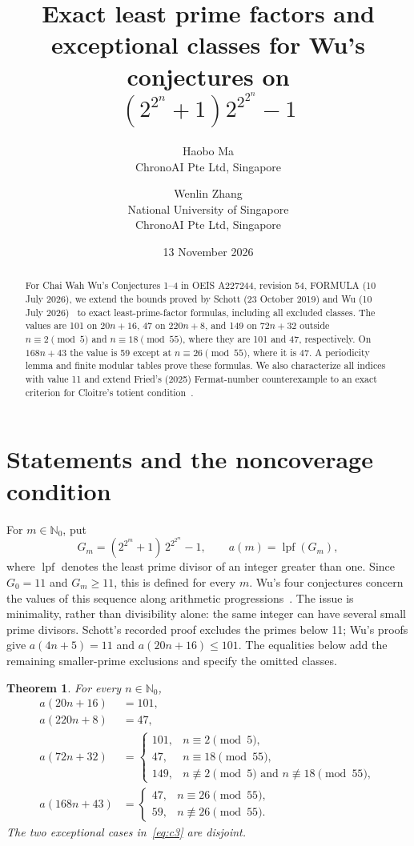 \documentclass[11pt]{article}
\title{Exact least prime factors and exceptional classes for Wu's conjectures on\protect\\
$(2^{2^n}+1)2^{2^{2^n}}-1$}
\author{Haobo Ma\\\small ChronoAI Pte Ltd, Singapore
\and Wenlin Zhang\\\small National University of Singapore\\\small ChronoAI Pte Ltd, Singapore}
\date{13 November 2026}
\newtheorem{theorem}{Theorem}
\newcommand{\N}{\mathbb{N}_0}
\newcommand{\lpf}{\operatorname{lpf}}
\begin{document}
\maketitle
\begin{abstract}
For Chai Wah Wu's Conjectures 1--4 in OEIS A227244, revision 54, FORMULA
(10 July 2026), we extend the bounds proved by Schott (23 October 2019)
and Wu (10 July 2026)~\cite{oeis} to exact least-prime-factor formulas,
including all excluded classes.
The values are 101 on $20n+16$, 47 on $220n+8$, and 149 on $72n+32$
outside $n\equiv2\pmod5$ and $n\equiv18\pmod{55}$, where they are 101
and 47, respectively. On $168n+43$ the value is 59 except at
$n\equiv26\pmod{55}$, where it is 47.
A periodicity lemma and finite modular tables prove these formulas.
We also characterize all indices with value 11 and extend Fried's (2025)
Fermat-number counterexample to an exact criterion for Cloitre's totient
condition~\cite{fried}.
\end{abstract}

\section{Statements and the noncoverage condition}
For $m\in\N$, put
\[
 G_m=(2^{2^m}+1)\,2^{2^{2^m}}-1,
 \qquad a(m)=\lpf(G_m),
\]
where $\lpf$ denotes the least prime divisor of an integer greater than one.
Since $G_0=11$ and $G_m\geq 11$, this is defined for every $m$.
Wu's four conjectures concern the values of this sequence along arithmetic
progressions~\cite{oeis}. The issue is minimality, rather than divisibility
alone: the same integer can have several small prime divisors.
Schott's recorded proof excludes the primes below 11; Wu's proofs give
$a(4n+5)=11$ and $a(20n+16)\leq101$. The equalities below add the
remaining smaller-prime exclusions and specify the omitted classes.

\begin{theorem}\label{thm:main}
For every $n\in\N$,
\begin{align}
 a(20n+16)&=101,\label{eq:c1}\\
 a(220n+8)&=47,\label{eq:c2}\\
 a(72n+32)&=
 \begin{cases}
 101,&n\equiv2\pmod5,\\
 47,&n\equiv18\pmod{55},\\
 149,&n\not\equiv2\pmod5\text{ and }n\not\equiv18\pmod{55},
 \end{cases}\label{eq:c3}\\
 a(168n+43)&=
 \begin{cases}
 47,&n\equiv26\pmod{55},\\
 59,&n\not\equiv26\pmod{55}.
 \end{cases}\label{eq:c4}
\end{align}
The two exceptional cases in~\eqref{eq:c3} are disjoint.
\end{theorem}
\end{document}
